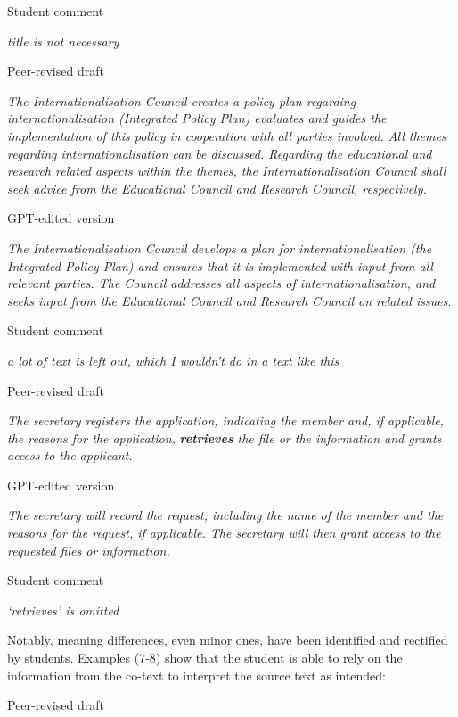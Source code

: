 \documentclass[output=paper]{langscibook}
\begin{document}
    \ex   Student comment

    \textit{title is not necessary}
    \z
\z

\ea%
    \label{ex:10:5}
    \ea   Peer-revised draft

    \textit{The Internationalisation Council creates a policy plan regarding internationalisation (Integrated Policy Plan) evaluates and guides the implementation of this policy in cooperation with all parties involved. All themes regarding internationalisation can be discussed. Regarding the educational and research related aspects within the themes, the Internationalisation Council shall seek advice from the Educational Council and Research Council, respectively.}

    \ex  GPT-edited version

    \textit{The Internationalisation Council develops a plan for internationalisation (the Integrated Policy Plan) and ensures that it is implemented with input from all relevant parties. The Council addresses all aspects of internationalisation, and seeks input from the Educational Council and Research Council on related issues}.

    \ex Student comment

    \textit{a lot of text is left out, which I wouldn't do in a text like this}
    \z
\z

\ea%
    \label{ex:10:6}
    \ea  Peer-revised draft

    \textit{The secretary registers the application, indicating the member and, if applicable, the reasons for the application,} \textbf{\textit{retrieves}} \textit{the file or the information and grants access to the applicant.}

    \ex  GPT-edited version

    \textit{The secretary will record the request, including the name of the member and the reasons for the request, if applicable. The secretary will then grant access to the requested files or information.}

    \ex   Student comment

    \textit{‘retrieves’ is omitted}
    \z
\z

Notably, meaning differences, even minor ones, have been identified and rectified by students. Examples (7-8) show that the student is able to rely on the information from the co-text to interpret the source text as intended: 

\ea%
    \label{ex:10:7}
    \ea  Peer-revised draft
\end{document}
